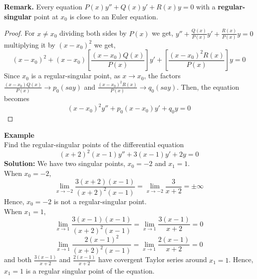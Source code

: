 \documentclass[10pt]{article}
\begin{document}
        \textbf{Remark.} Every equation $P(x)y'' + Q(x)y' + R(x)y = 0$ with a \textbf{regular-singular} point at $x_0$ is close to an Euler equation.
        \begin{proof}
            For $x \neq x_0$ dividing both sides by $P(x)$ we get, $y'' + \frac{Q(x)}{P(x)}y' + \frac{R(x)}{P(x)}y = 0$ multiplying it by $(x-x_0)^2$ we get, 
            $$(x-x_0)^2 + (x-x_0) \left[\frac{(x-x_0)Q(x)}{P(x)}\right]y' + \left[\frac{(x-x_0)^2R(x)}{P(x)}\right]y = 0$$
            Since $x_0$ is a regular-singular point, as $x\to x_0$, the factors $\frac{(x-x_0)Q(x)}{P(x)} \to p_0 (say)$ and $\frac{(x-x_0)^2R(x)}{P(x)} \to q_0 (say)$. Then, the equation becomes 
            $$(x-x_0)^2y'' + p_0(x-x_0)y' + q_0y = 0$$
        \end{proof}
        \textbf{Example}\\
        Find the regular-singular points of the differential equation $$(x+2)^2(x-1)y'' + 3(x-1)y' + 2y = 0$$
        \textbf{Solution: } We have two singular points, $x_0 = -2$ and $x_1 = 1$. \\
        When $x_0 = -2$, 
        $$\lim_{x\to-2} \frac{3(x+2)(x-1)}{(x+2)^2(x-1)} = \lim_{x\to-2} \frac{3}{x+2} = \pm \infty$$
        Hence, $x_0 = -2$ is not a regular-singular point.\\
        When $x_1 = 1$,
        $$\lim_{x\to1} \frac{3(x-1)(x-1)}{(x+2)^2(x-1)} = \lim_{x\to1} \frac{3(x-1)}{x+2} = 0$$ 
        $$\lim_{x\to1} \frac{2(x-1)^2}{(x+2)^2(x-1)} = \lim_{x\to1} \frac{2(x-1)}{x+2} = 0$$ 
        and both $\frac{3(x-1)}{x+2}$ and $\frac{2(x-1)}{x+2}$ have covergent Taylor series around $x_1 = 1$. Hence, $x_1 = 1$ is a regular singular point of the equation.
\end{document}
